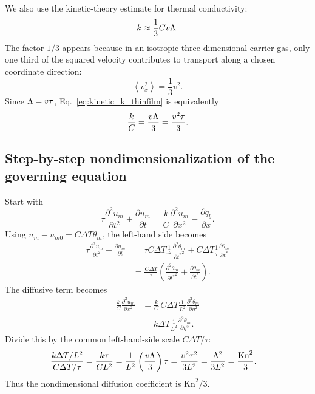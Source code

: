 \documentclass[11pt]{article}
\begin{document}
We also use the kinetic-theory estimate for thermal conductivity:
\begin{equation}
    k \approx \frac{1}{3}C v\Lambda.
    \label{eq:kinetic_k_thinfilm}
\end{equation}
The factor \(1/3\) appears because in an isotropic three-dimensional carrier gas, only one third of the squared velocity contributes to transport along a chosen coordinate direction:
\begin{equation}
    \left< v_x^2\right>=\frac{1}{3}v^2.
\end{equation}
Since \(\Lambda=v\tau\), Eq.~\eqref{eq:kinetic_k_thinfilm} is equivalently
\begin{equation}
    \frac{k}{C}=\frac{v\Lambda}{3}=\frac{v^2\tau}{3}.
\end{equation}

\subsection{Step-by-step nondimensionalization of the governing equation}
Start with
\begin{equation}
    \tau\frac{\partial^2u_m}{\partial t^2}+\frac{\partial u_m}{\partial t}
    =\frac{k}{C}\frac{\partial^2u_m}{\partial x^2}-\frac{\partial q_b}{\partial x}.
\end{equation}
Using \(u_m-u_{m0}=C\Delta T\theta_m\), the left-hand side becomes
\begin{align}
    \tau\frac{\partial^2u_m}{\partial t^2}+\frac{\partial u_m}{\partial t}
    &=\tau C\Delta T\frac{1}{\tau^2}\frac{\partial^2\theta_m}{\partial {t^*}^2}
    +C\Delta T\frac{1}{\tau}\frac{\partial\theta_m}{\partial t^*}\nonumber\\
    &=\frac{C\Delta T}{\tau}
    \left(\frac{\partial^2\theta_m}{\partial {t^*}^2}
    +\frac{\partial\theta_m}{\partial t^*}\right).
    \label{eq:lhs_nd_thinfilm}
\end{align}
The diffusive term becomes
\begin{align}
    \frac{k}{C}\frac{\partial^2u_m}{\partial x^2}
    &=\frac{k}{C}\,C\Delta T\frac{1}{L^2}\frac{\partial^2\theta_m}{\partial\eta^2}\\
    &=k\Delta T\frac{1}{L^2}\frac{\partial^2\theta_m}{\partial\eta^2}.
\end{align}
Divide this by the common left-hand-side scale \(C\Delta T/\tau\):
\begin{align}
    \frac{k\Delta T/L^2}{C\Delta T/\tau}
    &=\frac{k\tau}{C L^2}
    =\frac{1}{L^2}\left(\frac{v\Lambda}{3}\right)\tau
    =\frac{v^2\tau^2}{3L^2}
    =\frac{\Lambda^2}{3L^2}
    =\frac{\mathrm{Kn}^2}{3}.
\end{align}
Thus the nondimensional diffusion coefficient is \(\mathrm{Kn}^2/3\).
\end{document}
